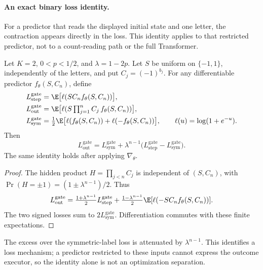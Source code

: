 \paragraph{An exact binary loss identity.}
For a predictor that reads the displayed initial state and one letter, the contraction
appears directly in the loss. This identity applies to that restricted predictor, not
to a count-reading path or the full Transformer.
\begin{lemma}
\label{lem:binary-loss-mixture}
Let $K=2$, $0<p<1/2$, and $\lambda=1-2p$. Let $S$ be uniform on
$\{-1,1\}$, independently of the letters, and put $C_j=(-1)^{b_j}$.
For any differentiable predictor $f_\theta(S,C_n)$, define
\[
\begin{aligned}
 L_{\mathrm{step}}^{\mathrm{gate}}&=\E\bigl[\ell(SC_n f_\theta(S,C_n))\bigr],\\
 L_{\mathrm{out}}^{\mathrm{gate}}&=\E\bigl[\ell(S\textstyle\prod_{j=1}^n C_j\, f_\theta(S,C_n))\bigr],\\
 L_{\mathrm{sym}}^{\mathrm{gate}}&=\tfrac12\E\bigl[\ell(f_\theta(S,C_n))+\ell(-f_\theta(S,C_n))\bigr],
 \qquad \ell(u)=\log(1+e^{-u}).
\end{aligned}
\]
Then
\begin{equation}
 L_{\mathrm{out}}^{\mathrm{gate}}
 =L_{\mathrm{sym}}^{\mathrm{gate}}
 +\lambda^{n-1}\bigl(L_{\mathrm{step}}^{\mathrm{gate}}-L_{\mathrm{sym}}^{\mathrm{gate}}\bigr).
 \label{eq:binary-loss-mixture}
\end{equation}
The same identity holds after applying $\nabla_\theta$.
\end{lemma}
\begin{proof}
The hidden product $H=\prod_{j<n}C_j$ is independent of $(S,C_n)$, with
$\Pr(H=\pm1)=(1\pm\lambda^{n-1})/2$. Thus
\[
 L_{\mathrm{out}}^{\mathrm{gate}}
 =\tfrac{1+\lambda^{n-1}}2 L_{\mathrm{step}}^{\mathrm{gate}}
 +\tfrac{1-\lambda^{n-1}}2
 \E[\ell(-SC_n f_\theta(S,C_n))].
\]
The two signed losses sum to $2L_{\mathrm{sym}}^{\mathrm{gate}}$.
Differentiation commutes with these finite expectations.
\end{proof}
The excess over the symmetric-label loss is attenuated by $\lambda^{n-1}$.
This identifies a loss mechanism; a predictor restricted to these inputs cannot
express the outcome executor, so the identity alone is not an optimization separation.

